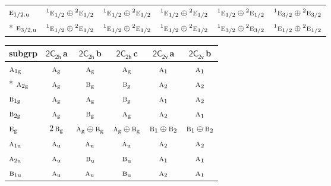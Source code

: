 \documentclass[10pt,a4paper]{article}
\numberwithin{equation}{section}
\newcommand{\grp}[1]{\mathsf{#1}}
\newcommand{\irr}[1]{\text{\normalfont\scshape #1}}
\newcommand{\conjpair}[1]{{}^{#1}}
\newcommand{\ptag}[1]{\mathrm{#1}}
\newcommand{\clsletter}[1]{\,{\scriptsize\color{black!55}#1}}
\begin{document}
{\begin{longtable}{@{}lccccc@{}}
$\irr{e}_{1/2,\ptag{u}}$ & $\conjpair{1}\irr{e}_{1/2}\oplus \conjpair{2}\irr{e}_{1/2}$ & $\conjpair{1}\irr{e}_{1/2}\oplus \conjpair{2}\irr{e}_{1/2}$ & $\conjpair{1}\irr{e}_{1/2}\oplus \conjpair{2}\irr{e}_{1/2}$ & $\conjpair{1}\irr{e}_{1/2}\oplus \conjpair{2}\irr{e}_{1/2}$ & $\conjpair{1}\irr{e}_{3/2}\oplus \conjpair{2}\irr{e}_{3/2}$\\*
$\irr{e}_{3/2,\ptag{u}}$ & $\conjpair{1}\irr{e}_{1/2}\oplus \conjpair{2}\irr{e}_{1/2}$ & $\conjpair{1}\irr{e}_{1/2}\oplus \conjpair{2}\irr{e}_{1/2}$ & $\conjpair{1}\irr{e}_{1/2}\oplus \conjpair{2}\irr{e}_{1/2}$ & $\conjpair{1}\irr{e}_{3/2}\oplus \conjpair{2}\irr{e}_{3/2}$ & $\conjpair{1}\irr{e}_{1/2}\oplus \conjpair{2}\irr{e}_{1/2}$\\
\bottomrule\end{longtable}}
{\small\begin{longtable}{@{}lccccc@{}}\toprule
subgrp & \href{2C2h.pdf}{$\grp{2C_{2h}}$}\clsletter{a} & \href{2C2h.pdf}{$\grp{2C_{2h}}$}\clsletter{b} & \href{2C2h.pdf}{$\grp{2C_{2h}}$}\clsletter{c} & \href{2C2v.pdf}{$\grp{2C_{2v}}$}\clsletter{a} & \href{2C2v.pdf}{$\grp{2C_{2v}}$}\clsletter{b}\\\midrule\endhead
\bottomrule\endfoot\endlastfoot
$\irr{a}_{1\ptag{g}}$ & $\irr{a}_{\ptag{g}}$ & $\irr{a}_{\ptag{g}}$ & $\irr{a}_{\ptag{g}}$ & $\irr{a}_{1}$ & $\irr{a}_{1}$\\*
$\irr{a}_{2\ptag{g}}$ & $\irr{a}_{\ptag{g}}$ & $\irr{b}_{\ptag{g}}$ & $\irr{b}_{\ptag{g}}$ & $\irr{a}_{2}$ & $\irr{a}_{2}$\\
$\irr{b}_{1\ptag{g}}$ & $\irr{a}_{\ptag{g}}$ & $\irr{a}_{\ptag{g}}$ & $\irr{b}_{\ptag{g}}$ & $\irr{a}_{1}$ & $\irr{a}_{2}$\\
$\irr{b}_{2\ptag{g}}$ & $\irr{a}_{\ptag{g}}$ & $\irr{b}_{\ptag{g}}$ & $\irr{a}_{\ptag{g}}$ & $\irr{a}_{2}$ & $\irr{a}_{1}$\\
$\irr{e}_{\ptag{g}}$ & $2\,\irr{b}_{\ptag{g}}$ & $\irr{a}_{\ptag{g}}\oplus \irr{b}_{\ptag{g}}$ & $\irr{a}_{\ptag{g}}\oplus \irr{b}_{\ptag{g}}$ & $\irr{b}_{1}\oplus \irr{b}_{2}$ & $\irr{b}_{1}\oplus \irr{b}_{2}$\\
$\irr{a}_{1\ptag{u}}$ & $\irr{a}_{\ptag{u}}$ & $\irr{a}_{\ptag{u}}$ & $\irr{a}_{\ptag{u}}$ & $\irr{a}_{2}$ & $\irr{a}_{2}$\\
$\irr{a}_{2\ptag{u}}$ & $\irr{a}_{\ptag{u}}$ & $\irr{b}_{\ptag{u}}$ & $\irr{b}_{\ptag{u}}$ & $\irr{a}_{1}$ & $\irr{a}_{1}$\\
$\irr{b}_{1\ptag{u}}$ & $\irr{a}_{\ptag{u}}$ & $\irr{a}_{\ptag{u}}$ & $\irr{b}_{\ptag{u}}$ & $\irr{a}_{2}$ & $\irr{a}_{1}$\\

\end{longtable}}
\end{document}
